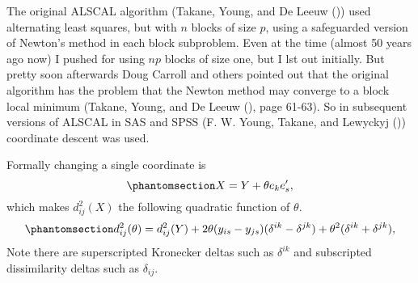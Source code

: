 \documentclass[
  12pt,
  letterpaper,
  DIV=11,
  numbers=noendperiod]{scrartcl}
\begin{document}
The original ALSCAL algorithm (Takane, Young, and De Leeuw
()) used alternating least
squares, but with \(n\) blocks of size \(p\), using a safeguarded
version of Newton's method in each block subproblem. Even at the time
(almost 50 years ago now) I pushed for using \(np\) blocks of size one,
but I lst out initially. But pretty soon afterwards Doug Carroll and
others pointed out that the original algorithm has the problem that the
Newton method may converge to a block local minimum (Takane, Young, and
De Leeuw (), page 61-63).
So in subsequent versions of ALSCAL in SAS and SPSS (F. W. Young,
Takane, and Lewyckyj ())
coordinate descent was used.

Formally changing a single coordinate is
\begin{equation}\phantomsection\label{eq-xchange}{
X=Y+\theta e_ke_s',
}\end{equation} which makes \(d_{ij}^2(X)\) the following quadratic
function of \(\theta\).
\begin{equation}\phantomsection\label{eq-dchange}{
d_{ij}^2(\theta)=
d_{ij}^2(Y)+2\theta (y_{is}-y_{js})(\delta^{ik}-\delta^{jk})+\theta^2(\delta^{ik}+\delta^{jk}),
}\end{equation} Note there are superscripted Kronecker deltas such as
\(\delta^{ik}\) and subscripted dissimilarity deltas such as
\(\delta_{ij}\).
\end{document}
